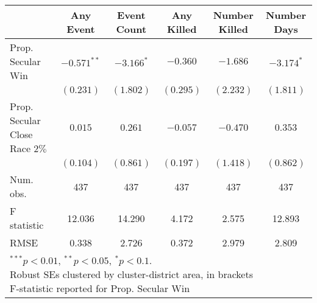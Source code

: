 
\begin{tabular}{l c c c c c }
\hline
 & Any Event & Event Count & Any Killed & Number Killed & Number Days \\
\hline
Prop. Secular Win              & $-0.571^{**}$ & $-3.166^{*}$ & $-0.360$  & $-1.686$  & $-3.174^{*}$ \\
                               & $(0.231)$     & $(1.802)$    & $(0.295)$ & $(2.232)$ & $(1.811)$    \\
Prop. Secular Close Race $2\%$ & $0.015$       & $0.261$      & $-0.057$  & $-0.470$  & $0.353$      \\
                               & $(0.104)$     & $(0.861)$    & $(0.197)$ & $(1.418)$ & $(0.862)$    \\
\hline
Num. obs.                      & 437           & 437          & 437       & 437       & 437          \\
F statistic                    & 12.036        & 14.290       & 4.172     & 2.575     & 12.893       \\
RMSE                           & 0.338         & 2.726        & 0.372     & 2.979     & 2.809        \\
\hline
\multicolumn{6}{l}{\scriptsize{\parbox{.6\linewidth}{\vspace{2pt}$^{***}p<0.01$, $^{**}p<0.05$, $^*p<0.1$. \\
       Robust SEs clustered by cluster-district area, in brackets\\ F-statistic reported for Prop. Secular Win}}}
\end{tabular}
